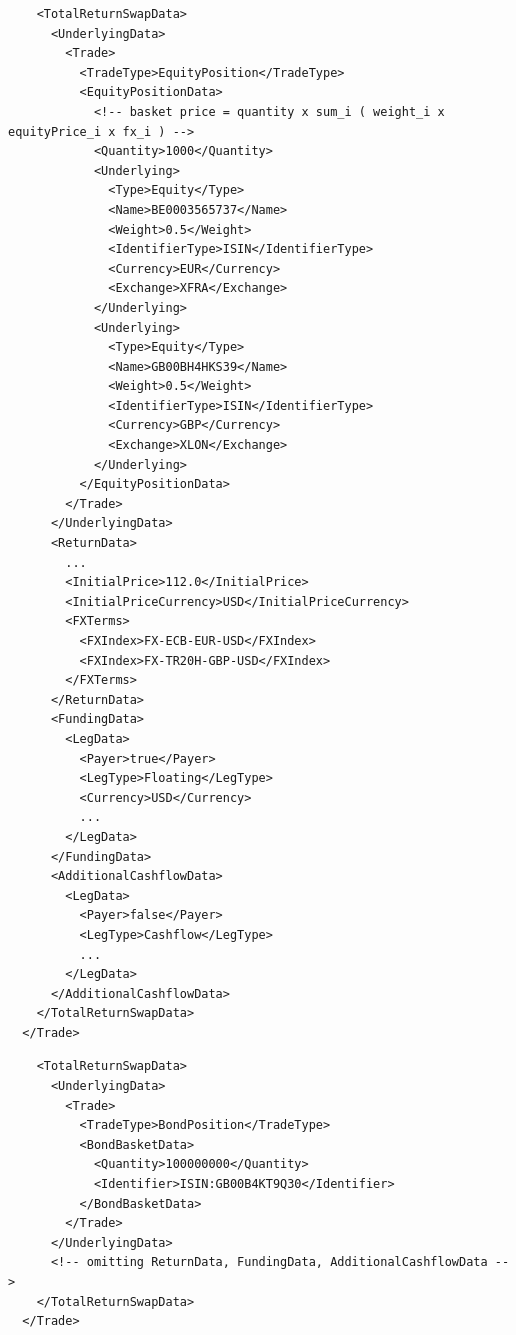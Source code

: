 \begin{listing}[H]
\begin{verbatim}
    <TotalReturnSwapData>
      <UnderlyingData>
        <Trade>
          <TradeType>EquityPosition</TradeType>
          <EquityPositionData>
            <!-- basket price = quantity x sum_i ( weight_i x equityPrice_i x fx_i ) -->
            <Quantity>1000</Quantity>
            <Underlying>
              <Type>Equity</Type>
              <Name>BE0003565737</Name>
              <Weight>0.5</Weight>
              <IdentifierType>ISIN</IdentifierType>
              <Currency>EUR</Currency>
              <Exchange>XFRA</Exchange>
            </Underlying>
            <Underlying>
              <Type>Equity</Type>
              <Name>GB00BH4HKS39</Name>
              <Weight>0.5</Weight>
              <IdentifierType>ISIN</IdentifierType>
              <Currency>GBP</Currency>
              <Exchange>XLON</Exchange>
            </Underlying>
          </EquityPositionData>
        </Trade>
      </UnderlyingData>
      <ReturnData>
        ...
        <InitialPrice>112.0</InitialPrice>
        <InitialPriceCurrency>USD</InitialPriceCurrency>
        <FXTerms>
          <FXIndex>FX-ECB-EUR-USD</FXIndex>
          <FXIndex>FX-TR20H-GBP-USD</FXIndex>
        </FXTerms>
      </ReturnData>
      <FundingData>
        <LegData>
          <Payer>true</Payer>
          <LegType>Floating</LegType>
          <Currency>USD</Currency>
          ...
        </LegData>
      </FundingData>
      <AdditionalCashflowData>
        <LegData>
          <Payer>false</Payer>
          <LegType>Cashflow</LegType>
          ...
        </LegData>
      </AdditionalCashflowData>
    </TotalReturnSwapData>
  </Trade>
\end{verbatim}
\caption{Generic Total Return Swap with Equity Basket underlying}
\label{lst:trsdata2}
\end{listing}

\begin{listing}[H]
\begin{verbatim}
    <TotalReturnSwapData>
      <UnderlyingData>
        <Trade>
          <TradeType>BondPosition</TradeType>
          <BondBasketData>
            <Quantity>100000000</Quantity>
            <Identifier>ISIN:GB00B4KT9Q30</Identifier>
          </BondBasketData>
        </Trade>
      </UnderlyingData>
      <!-- omitting ReturnData, FundingData, AdditionalCashflowData -->
    </TotalReturnSwapData>
  </Trade>
\end{verbatim}
\caption{Generic Total Return Swap with Bond Basket underlying}
\label{lst:trsdata3}
\end{listing}

